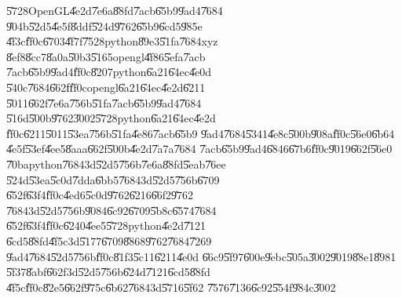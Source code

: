 \U{5728}OpenGL\U{4e2d}\U{7e6a}\U{88fd}\U{7acb}\U{65b9}\U{9ad4}\U{7684}%
\U{904b}\U{52d5}\U{4e5f}\U{8ddf}\U{524d}\U{9762}\U{65b9}\U{6cd5}\U{985e}%
\U{4f3c}\U{ff0c}\U{6703}\U{4f7f}\U{7528}python\U{89e3}\U{51fa}\U{7684}xyz%
\U{8ef8}\U{8cc7}\U{8a0a}\U{50b3}\U{5165}opengl\U{4f86}\U{5efa}\U{7acb}%
\U{7acb}\U{65b9}\U{9ad4}\U{ff0c}\U{8207}python\U{6a21}\U{64ec}\U{4e0d}%
\U{540c}\U{7684}\U{662f}\U{ff0c}opengl\U{6a21}\U{64ec}\U{4e2d}\U{6211}%
\U{5011}\U{662f}\U{7e6a}\U{756b}\U{51fa}\U{7acb}\U{65b9}\U{9ad4}\U{7684}%
\U{516d}\U{500b}\U{9762}\U{3002}\U{5728}python\U{6a21}\U{64ec}\U{4e2d}%
\U{ff0c}\U{6211}\U{5011}\U{53ea}\U{756b}\U{51fa}\U{4e86}\U{7acb}\U{65b9}%
\U{9ad4}\U{7684}\U{5341}\U{4e8c}\U{500b}\U{908a}\U{ff0c}\U{56e0}\U{6b64}%
\U{4e5f}\U{53ef}\U{4ee5}\U{8aaa}\U{662f}\U{500b}\U{4e2d}\U{7a7a}\U{7684}%
\U{7acb}\U{65b9}\U{9ad4}\U{6846}\U{67b6}\U{ff0c}\U{9019}\U{662f}\U{56e0}%
\U{70ba}python\U{7684}3d\U{52d5}\U{756b}\U{7e6a}\U{88fd}\U{5eab}\U{76ee}%
\U{524d}\U{53ea}\U{5c0d}\U{7dda}\U{6bb5}\U{7684}3d\U{52d5}\U{756b}\U{6709}%
\U{652f}\U{63f4}\U{ff0c}\U{4ed6}\U{5c0d}\U{9762}\U{6216}\U{66f2}\U{9762}%
\U{7684}3d\U{52d5}\U{756b}\U{9084}\U{6c92}\U{6709}\U{5b8c}\U{6574}\U{7684}%
\U{652f}\U{63f4}\U{ff0c}\U{6240}\U{4ee5}\U{5728}python\U{4e2d}\U{7121}%
\U{6cd5}\U{88fd}\U{4f5c}3d\U{5177}\U{6709}\U{8868}\U{9762}\U{7684}\U{7269}%
\U{9ad4}\U{7684}\U{52d5}\U{756b}\U{ff0c}\U{81f3}\U{5c11}\U{6211}\U{4e0d}%
\U{66c9}\U{5f97}\U{600e}\U{9ebc}\U{505a}\U{3002}\U{9019}\U{88e1}\U{8981}%
\U{5f37}\U{8abf}\U{662f}3d\U{52d5}\U{756b}\U{624d}\U{7121}\U{6cd5}\U{88fd}%
\U{4f5c}\U{ff0c}\U{82e5}\U{662f}\U{975c}\U{6b62}\U{7684}3d\U{5716}\U{5f62}%
\U{7576}\U{7136}\U{6c92}\U{554f}\U{984c}\U{3002}

\bigskip

